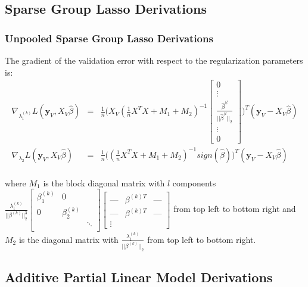 \documentclass[10pt,letterpaper]{article}
\begin{document}
\subsection{Sparse Group Lasso Derivations}

\subsubsection{Unpooled Sparse Group Lasso Derivations}
The gradient of the validation error with respect to the regularization parameters is:
\begin{equation}
\begin{array}{lcl}
\nabla_{\lambda_1^{(k)}} L(\boldsymbol y_V, X_V \hat \beta) &=& 
\frac{1}{n}
\Bigg (
X_V
(\frac{1}{n} X^T X + M_1 + M_2)^{-1}
\begin{bmatrix}
0 \\
\vdots \\
\frac{\hat\beta^{(l}}{||\hat\beta^{(l}||_2}\\
\vdots\\
0
\end{bmatrix}
\Bigg )^T
(\boldsymbol y_V - X_V \hat \beta)
 \\
\nabla_{\lambda_2} L(\boldsymbol y_V, X_V \hat \beta) &=&
\frac{1}{n}
\Bigg (
(\frac{1}{n} X^T X + M_1 + M_2)^{-1} sign(\hat \beta)
\Bigg )^T
(\boldsymbol y_V - X_V \hat \beta)
\\ 
\end{array}
\end{equation}

where $M_1$ is the block diagonal matrix with $l$ components 
$
\frac{\lambda_1^{(k)}}{|| \beta^{(k)}||_2^3}
\begin{bmatrix} 
\beta_1^{(k)} & 0 & \\
0 & \beta_2^{(k)} &  \\
 &  & \ddots \\
\end{bmatrix}
\begin{bmatrix}
\text{---} & \beta^{(k)T} & \text{---} \\
\text{---} & \beta^{(k)T} & \text{---} \\
\vdots
\end{bmatrix}
$ from top left to bottom right and $M_2$ is the diagonal matrix with $\frac{\lambda_1^{(k)}}{|| \beta^{(k)}||_2}$ from top left to bottom right.


\subsection{Additive Partial Linear Model Derivations}
\end{document}
